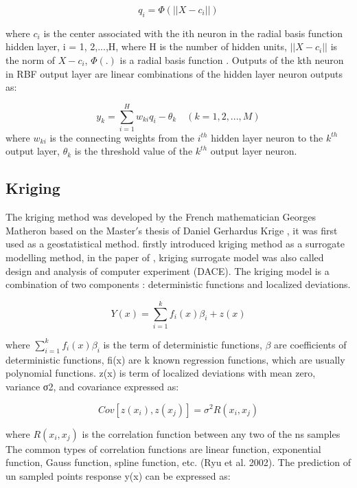 \begin{equation}
q_{i} = \varPhi(|| X - c_{i} ||)
\end{equation}

where $ c_{i} $ is the center associated with the ith neuron in the radial basis function hidden layer, i = 1, 2,...,H, where H is the number of hidden units, $ || X - c_{i} || $ is the norm of $ X − c_{i} $, $ \varPhi (.) $ is a radial basis function \cite{chen1991orthogonal}. Outputs of the kth neuron in RBF output layer are linear combinations of the hidden layer neuron outputs as:

\begin{equation}
y_{k} = \sum_{i=1}^{H} w_{ki} q_{i} - \theta _{k} \quad (k = 1, 2,...,M)
\end{equation}
where $ w_{ki} $ is the connecting weights from the $ i^{th} $ hidden layer neuron to the $ k^{th} $ output layer, $ \theta _{k} $ is the threshold value of the $ k^{th} $ output layer neuron.

\subsection{Kriging}
The kriging method was developed by the French mathematician Georges Matheron based on the Master$ ' $s thesis of Daniel Gerhardus Krige \cite{matheron1963principles}, it was first used as a geostatistical method. \cite{sacks1989design} firstly introduced kriging method as a surrogate modelling method, in the paper of \cite{sacks1989design}, kriging surrogate model was also called design and analysis of computer experiment (DACE). The kriging model is a combination of two components \cite{queipo2005surrogate}: deterministic functions and localized deviations.

\begin{equation}
Y(x) = \sum_{i=1}^{k} f_{i} (x) \beta _{i} + z(x)
\end{equation}

where $ \sum_{i=1}^{k} f_{i} (x) \beta _{i} $ is the term of deterministic functions, $ \beta$ are coefficients of deterministic functions, fi(x) are k known regression functions, which are usually polynomial functions. z(x) is term of localized deviations with mean zero, variance σ2, and covariance expressed as:

\begin{equation}
Cov[z(x_{i}),z(x_{j})] = \sigma ^{2} R (x_{i},x_{j})
\end{equation}

where $ R (x_{i},x_{j}) $  is the correlation function between any two of the ns samples The common types of correlation functions are linear function, exponential function, Gauss function, spline function, etc. (Ryu et al. 2002). The prediction of un sampled points response y(x) can be expressed as:

